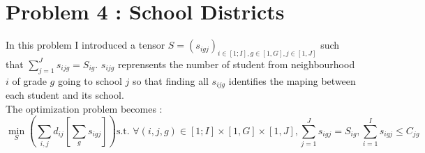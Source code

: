 \documentclass{article}
\begin{document}
\section*{Problem 4 : School Districts}
In this problem I introduced a tensor
 $S=(s_{igj})_{i\in[1;I],g\in[1,G],j\in[1,J]}$ such that $\sum_{j=1}^Js_{ijg} = S_{ig}$.
 $s_{ijg}$ reprensents the number of student from neighbourhood $i$ of grade $g$ going to school $j$
 so that finding all $s_{ijg}$ identifies the maping between each student and its school.
\\
The optimization problem becomes : 
\begin{equation}
    \min_S\left(\sum_{i,j}d_{ij}\left[\sum_{g}s_{igj}\right]\right)
    \text{s.t. } \forall (i,j,g)\in[1;I]\times[1,G]\times[1,J], \sum_{j=1}^{J} s_{igj} = S_{ig}, \sum_{i=1}^{I} s_{igj} \leq C_{jg}
\end{equation}
\end{document}
